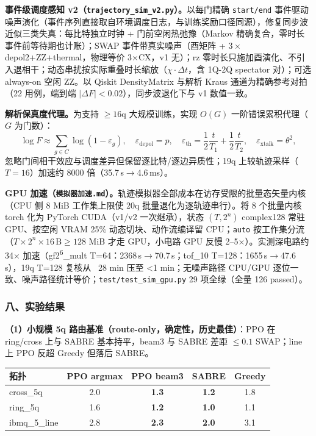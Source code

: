 \textbf{事件级调度感知 v2（\texttt{trajectory\_sim\_v2.py}）。}以每门精确 \texttt{start/end} 事件驱动噪声演化（事件序列直接取自环境调度日志，与训练奖励口径同源），修复同步波近似三类失真：每比特独立时钟 + 门前空闲热弛豫（Markov 精确复合，零时长事件前等待期也计账）；SWAP 事件带真实噪声（酉矩阵 + $3\times$depol2+ZZ+thermal，物理等价 3$\times$CX，v1 无）；rz 零时长只施加酉演化、不引入退相干；动态串扰按实际重叠时长缩放（$\chi\cdot\Delta t$，含 1Q-2Q spectator 对）；可选 always-on 空闲 ZZ。以 Qiskit DensityMatrix 与解析 Kraus 通道为精确参考对拍（22 用例，端到端 $|\Delta F|<0.02$），同步波退化下与 v1 数值一致。

\textbf{解析保真度代理。}为支持 $\ge16$q 大规模训练，实现 $O(G)$ 一阶错误累积代理（$G$ 为门数）：
\[
\log F\approx\sum_{g\in C}\log(1-\varepsilon_g),\quad
\varepsilon_{\mathrm{depol}}=p,\quad
\varepsilon_{\mathrm{th}}=\frac12\frac{t}{T_1}+\frac12\frac{t}{T_2},\quad
\varepsilon_{\mathrm{xtalk}}=\theta^2,
\]
忽略门间相干效应与调度差异但保留逐比特/逐边异质性；19q 上较轨迹采样（$T=16$）加速约 8000 倍（35.7\,s$\to$4.6\,ms）。

\textbf{GPU 加速（\texttt{模拟器加速.md}）。}轨迹模拟器全部成本在访存受限的批量态矢量内核（CPU 侧 8 MiB 工作集上限使 20q 批量退化为逐轨迹串行）。将 8 个批量内核 torch 化为 PyTorch CUDA（v1/v2 一次继承），状态 $(T,2^n)$ complex128 常驻 GPU、按空闲 VRAM 25\% 动态切块、动作流编译留 CPU；\texttt{auto} 按工作集分流（$T\times2^n\times16\,\mathrm{B}\ge128$ MiB 才走 GPU，小电路 GPU 反慢 2--5$\times$）。实测深电路约 34$\times$ 加速（gf2\textsuperscript{6}\_mult T=64：2368\,s$\to$70.7\,s；tof\_10 T=128：1655\,s$\to$47.6\,s），19q T=128 复核从 ~28 min 压至 <1 min；无噪声路径 CPU/GPU 逐位一致、噪声路径统计等价；\texttt{test/test\_sim\_gpu.py} 29 项全绿（全量 126 passed）。


\subsubsection{八、实验结果}

\textbf{（1）小规模 5q 路由基准（route-only，确定性，历史最佳）}：PPO 在 ring/cross 上与 SABRE 基本持平，beam3 与 SABRE 差距 $\le0.1$ SWAP；line 上 PPO 反超 Greedy 但落后 SABRE。
\begin{table}[htbp]
\centering
\small
\begin{tabular}{l|ccc|c}
\hline
拓扑 & PPO argmax & PPO beam3 & SABRE & Greedy \\
\hline
cross\_5q & 2.0 & \textbf{1.3} & \textbf{1.2} & 1.8 \\
ring\_5q & 1.6 & \textbf{1.2} & \textbf{1.0} & 1.1 \\
ibmq\_5\_line & 2.8 & \textbf{2.3} & \textbf{2.0} & 3.1 \\
\hline
\end{tabular}
\end{table}

